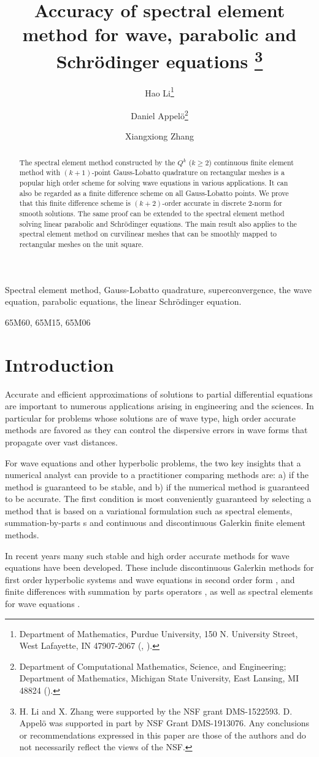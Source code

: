 \documentclass[onefignum,onetabnum]{siamart171218}
\title{Accuracy  of spectral element method for  wave, parabolic and Schr\"{o}dinger equations 
\thanks{H. Li and X. Zhang were supported by the NSF grant DMS-1522593. D. Appel\"{o} was supported in part by NSF Grant DMS-1913076. Any conclusions or recommendations expressed in this paper are those of the authors and do not necessarily reflect the views of the NSF.}
}
\author{Hao Li\thanks{Department of Mathematics,
Purdue University,
150 N. University Street,
West Lafayette, IN 47907-2067
  (\email{li2497@purdue.edu}, \email{zhan1966@purdue.edu}).}
  \and Daniel Appel\"{o}\thanks{Department of Computational Mathematics, Science, and Engineering; Department of Mathematics, Michigan State University, East Lansing, MI 48824
(\email{appeloda@msu.edu}).} \and Xiangxiong Zhang\footnotemark[2]}
\begin{document}
\maketitle

\begin{abstract}
 The spectral element method constructed by the $Q^k$ ($k\geq 2$) continuous finite element method with $(k+1)$-point Gauss-Lobatto quadrature on rectangular meshes
is a popular high order scheme for solving wave equations in various applications. It can also be regarded as 
a finite difference  scheme on all Gauss-Lobatto points. We prove that this finite difference scheme is $(k+2)$-order accurate in discrete 2-norm for smooth solutions.   The same proof can be extended to the spectral element method solving linear parabolic and Schr\"odinger equations.
The main result also applies to the spectral element method on curvilinear meshes that can be smoothly mapped to  rectangular meshes on the unit square. \end{abstract}
\begin{keywords}
Spectral element method, Gauss-Lobatto quadrature, superconvergence, the wave equation, parabolic equations, the linear Schr\"odinger equation.
\end{keywords}
\begin{AMS}
 	65M60, 65M15,	65M06
\end{AMS}

\section{Introduction}
Accurate and efficient approximations of solutions to partial differential equations are important to numerous applications arising in engineering and the sciences. In particular for problems whose solutions are of wave type, high order accurate methods are favored as they can control the dispersive errors in wave forms that propagate over vast distances.  

For wave equations and other hyperbolic problems, the two key insights that a numerical analyst can provide to a practitioner comparing methods are: a) if the method is guaranteed to be stable, and b) if the numerical method is guaranteed to be accurate. The first condition is most conveniently guaranteed by selecting a method that is based on a variational formulation such as spectral elements, summation-by-parts 
s and continuous and discontinuous Galerkin finite element methods.  

In recent years many such stable and high order accurate methods  for wave equations have been developed. These include discontinuous Galerkin methods for first order hyperbolic systems 
\cite{HesthavenWarburton02,Monk:2005aa,ChungEngquist06,ChungEngquist09,HesthavenWarburton08,TW_low_storage_curve,MengShuWu15}
and wave equations in second order form \cite{IPDG_Elastic,GSSwave,ChouShuXing2014,Upwind2}, and finite differences with summation by parts operators \cite{Mattsson2012,Mattsson2004,Mattsson2008,Virta2014,Almquist2019,Wang2018,Wang2016}, as well as spectral elements for wave equations \cite{komatitsch1999spectral, komatitsch1999introduction}. 
\end{document}
